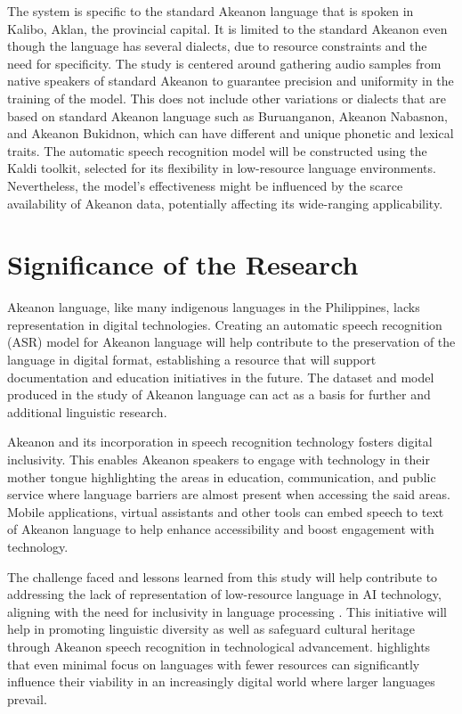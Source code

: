 The system is specific to the standard Akeanon language that is spoken in Kalibo, Aklan, the provincial capital. It is limited to the standard Akeanon even though the language has several dialects, due to resource constraints and the need for specificity. The study is centered around gathering audio samples from native speakers of standard Akeanon to guarantee precision and uniformity in the training of the model. This does not include other variations or dialects that are based on standard Akeanon language such as Buruanganon, Akeanon Nabasnon, and Akeanon Bukidnon, which can have different and unique phonetic and lexical traits. The automatic speech recognition model will be constructed using the Kaldi toolkit, selected for its flexibility in low-resource language environments. Nevertheless, the model's effectiveness might be influenced by the scarce availability of Akeanon data, potentially affecting its wide-ranging applicability.

\section{Significance of the Research}
\label{sec:significance}

Akeanon language, like many indigenous languages in the Philippines, lacks representation in digital technologies. Creating an automatic speech recognition (ASR) model for Akeanon language will help contribute to the preservation of the language in digital format, establishing a resource that will support documentation and education initiatives in the future. The dataset and model produced in the study of Akeanon language can act as a basis for further and additional linguistic research.

Akeanon and its incorporation in speech recognition technology fosters digital inclusivity. This enables Akeanon speakers to engage with technology in their mother tongue highlighting the areas in education, communication, and public service where language barriers are almost present when accessing the said areas. Mobile applications, virtual assistants and other tools can embed speech to text of Akeanon language to help enhance accessibility and boost engagement with technology.

The challenge faced and lessons learned from this study will help contribute to addressing the lack of representation of low-resource language in AI technology, aligning with the need for inclusivity in language processing \cite{Poupard:2024}. This initiative will help in promoting linguistic diversity as well as safeguard cultural heritage through Akeanon speech recognition in technological advancement.  highlights that even minimal focus on languages with fewer resources can significantly influence their viability in an increasingly digital world where larger languages prevail.



